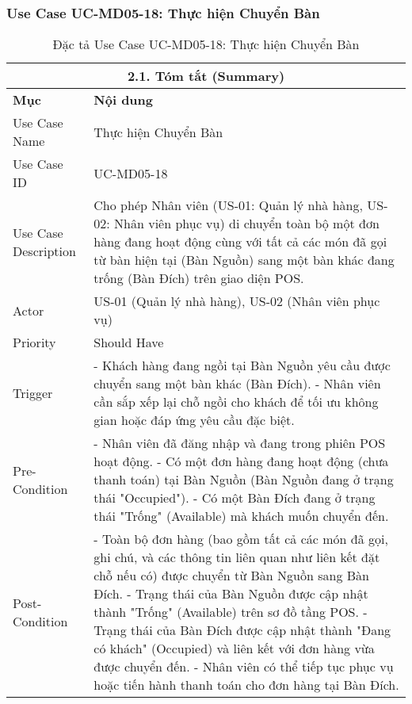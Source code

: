 \subsubsection{Use Case UC-MD05-18: Thực hiện Chuyển Bàn}
\begin{longtable}{|m{4cm}|p{11cm}|}
\caption{Đặc tả Use Case UC-MD05-18: Thực hiện Chuyển Bàn} \label{tab:uc_md05_18_final} \\
\hline
\multicolumn{2}{|c|}{\textbf{2.1. Tóm tắt (Summary)}} \\
\hline
\textbf{Mục} & \textbf{Nội dung} \\
\hline
\endhead %
\hline
\endfoot %
\hline
\endlastfoot %
Use Case Name & Thực hiện Chuyển Bàn \\
\hline
Use Case ID & UC-MD05-18 \\
\hline
Use Case Description & Cho phép Nhân viên (US-01: Quản lý nhà hàng, US-02: Nhân viên phục vụ) di chuyển toàn bộ một đơn hàng đang hoạt động cùng với tất cả các món đã gọi từ bàn hiện tại (Bàn Nguồn) sang một bàn khác đang trống (Bàn Đích) trên giao diện POS. \\
\hline
Actor & US-01 (Quản lý nhà hàng), US-02 (Nhân viên phục vụ) \\
\hline
Priority & Should Have \\
\hline
Trigger & - Khách hàng đang ngồi tại Bàn Nguồn yêu cầu được chuyển sang một bàn khác (Bàn Đích). \newline - Nhân viên cần sắp xếp lại chỗ ngồi cho khách để tối ưu không gian hoặc đáp ứng yêu cầu đặc biệt. \\
\hline
Pre-Condition & - Nhân viên đã đăng nhập và đang trong phiên POS hoạt động. \newline - Có một đơn hàng đang hoạt động (chưa thanh toán) tại Bàn Nguồn (Bàn Nguồn đang ở trạng thái "Occupied"). \newline - Có một Bàn Đích đang ở trạng thái "Trống" (Available) mà khách muốn chuyển đến. \\
\hline
Post-Condition & - Toàn bộ đơn hàng (bao gồm tất cả các món đã gọi, ghi chú, và các thông tin liên quan như liên kết đặt chỗ nếu có) được chuyển từ Bàn Nguồn sang Bàn Đích. \newline - Trạng thái của Bàn Nguồn được cập nhật thành "Trống" (Available) trên sơ đồ tầng POS. \newline - Trạng thái của Bàn Đích được cập nhật thành "Đang có khách" (Occupied) và liên kết với đơn hàng vừa được chuyển đến. \newline - Nhân viên có thể tiếp tục phục vụ hoặc tiến hành thanh toán cho đơn hàng tại Bàn Đích. \\

\end{longtable}
